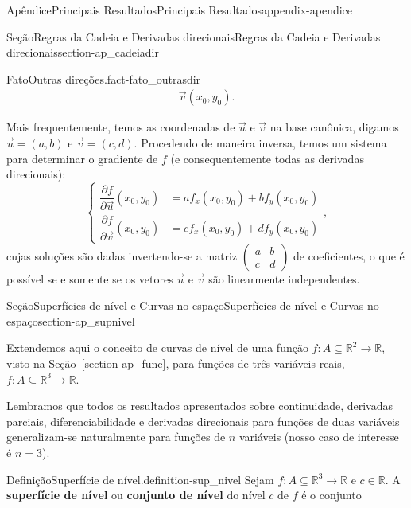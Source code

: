 \documentclass[oneside,10pt,]{book}
\newcommand{\xreffont}{\relax}
\newcommand{\terminology}[1]{\textbf{#1}}
\numberwithin{equation}{section}
\newcommand{\R}{\mathbb R}
\begin{document}
\begin{appendixptx}{Apêndice}{Principais Resultados}{}{Principais Resultados}{}{}{appendix-apendice}
\begin{sectionptx}{Seção}{Regras da Cadeia e Derivadas direcionais}{}{Regras da Cadeia e Derivadas direcionais}{}{}{section-ap_cadeiadir}
\begin{fact}{Fato}{Outras direções.}{}{fact-fato_outrasdir}
\begin{align*}
{\vec{v}}(x_0,y_0).
\end{align*}
%
\par
Mais frequentemente, temos as coordenadas de \(\vec{u}\) e \(\vec{v}\) na base canônica, digamos \(\vec{u}=(a,b)\) e \(\vec{v}=(c,d)\). Procedendo de maneira inversa, temos um sistema para determinar o gradiente de \(f\) (e consequentemente todas as derivadas direcionais):%
\begin{equation*}
\begin{cases}
\dfrac{\partial f}{\partial
\vec{u}}(x_0,y_0)&=af_x(x_0,y_0)+bf_y(x_0,y_0)\\
\dfrac{\partial f}{\partial
\vec{v}}(x_0,y_0)&=cf_x(x_0,y_0)+df_y(x_0,y_0)
\end{cases},
\end{equation*}
cujas soluções são dadas invertendo-se a matriz \(\begin{pmatrix}
a&b\\ c&d \end{pmatrix}\) de coeficientes, o que é possível se e somente se os vetores \(\vec{u}\) e \(\vec{v}\) são linearmente independentes.%
\end{fact}
\end{sectionptx}
%
%
\typeout{************************************************}
\typeout{************************************************}
%
\begin{sectionptx}{Seção}{Superfícies de nível e Curvas no espaço}{}{Superfícies de nível e Curvas no espaço}{}{}{section-ap_supnivel}
\begin{introduction}{}%
Extendemos aqui o conceito de curvas de nível de uma função \(f\colon A\subseteq\R^2\to\R\), visto na \hyperref[section-ap_func]{Seção~{\xreffont\ref{section-ap_func}}}, para funções de três variáveis reais, \(f\colon
A\subseteq\R^3\to\R\).%
\par
Lembramos que todos os resultados apresentados sobre continuidade, derivadas parciais, diferenciabilidade e derivadas direcionais para funções de duas variáveis generalizam-se naturalmente para funções de \(n\) variáveis (nosso caso de interesse é \(n=3\)).%
\end{introduction}%
\begin{definition}{Definição}{Superfície de nível.}{definition-sup_nivel}%
 Sejam \(f\colon A\subseteq\R^3\to\R\) e \(c\in\R\). A \terminology{superfície de nível} ou \terminology{conjunto de nível} do nível \(c\) de \(f\) é o conjunto%
\begin{equation*}

\end{equation*}
\end{definition}
\end{sectionptx}
\end{appendixptx}
\end{document}
